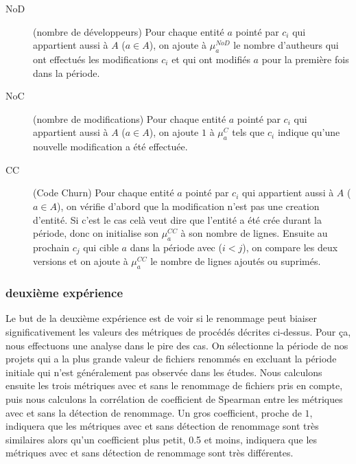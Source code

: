 \begin{description}
	\item[NoD] (nombre de développeurs) Pour chaque entité $a$ pointé par $c_i$ qui appartient aussi à $A$ ($a \in A$), on ajoute à $\mu_{a}^{NoD}$ le nombre d'autheurs qui ont effectués les modifications $c_i$ et qui ont modifiés $a$ pour la première fois dans la période.
	\item[NoC] (nombre de modifications) Pour chaque entité $a$ pointé par $c_i$ qui appartient aussi à $A$ ($a \in A$), on ajoute $1$ à $\mu_{a}^{C}$ tels que $c_i$ indique qu'une nouvelle modification a été effectuée.
	\item[CC] (Code Churn) Pour chaque entité $a$ pointé par $c_i$ qui appartient aussi à $A$ ($a \in A$), on vérifie d'abord que la modification n'est pas une creation d'entité. Si c'est le cas celà veut dire que l'entité a été crée durant la période, donc on initialise son $\mu_{a}^{CC}$ à son nombre de lignes. Ensuite au prochain $c_j$ qui cible $a$ dans la période avec ($i < j$), on compare les deux versions et on ajoute à $\mu_{a}^{CC}$ le nombre de lignes ajoutés ou suprimés.
\end{description}

\subsubsection{deuxième expérience}

Le but de la deuxième expérience est de voir si le renommage peut biaiser significativement les valeurs des métriques de procédés décrites ci-dessus. Pour ça, nous effectuons une analyse dans le pire des cas. On sélectionne la période de nos projets qui a la plus grande valeur de fichiers renommés en excluant la période initiale qui n'est généralement pas observée dans les études. Nous calculons ensuite les trois métriques avec et sans le renommage de fichiers pris en compte, puis nous calculons la corrélation de coefficient de Spearman entre les métriques avec et sans la détection de renommage. Un gros coefficient, proche de $1$, indiquera que les métriques avec et sans détection de renommage sont très similaires alors qu'un coefficient plus petit, 0.5 et moins, indiquera que les métriques avec et sans détection de renommage sont très différentes.\\ 
